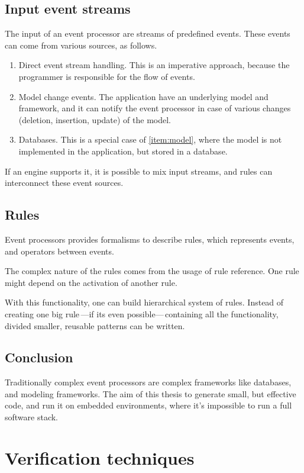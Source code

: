 \subsection{Input event streams}
\label{subsection:event_streams}
The input of an event processor are streams of predefined events. These events can come from various sources, as follows.
\begin{enumerate}
	\item Direct event stream handling. This is an imperative approach, because the programmer is responsible for the flow of events.
	\item\label{item:model} Model change events. The application have an underlying model and framework, and it can notify the event processor in case of various changes (deletion, insertion, update) of the model.
	\item Databases. This is a special case of \cref{item:model}, where the model is not implemented in the application, but stored in a database.
\end{enumerate}
\vspace{1ex}
If an engine supports it, it is possible to mix input streams, and rules can interconnect these event sources.

\subsection{Rules}
\label{subsection:rules}
Event processors provides formalisms to describe rules, which represents events, and operators between events.

The complex nature of the rules comes from the usage of rule reference. One rule might depend on the activation of another rule.

With this functionality, one can build hierarchical system of rules. Instead of creating one big rule\,---if its even possible---\,containing all the functionality, divided smaller, reusable patterns can be written.

\subsection{Conclusion}

Traditionally complex event processors are complex frameworks like databases, and modeling frameworks. The aim of this thesis to generate small, but effective code, and run it on embedded environments, where it's impossible to run a full  software stack.

\section{Verification techniques}


